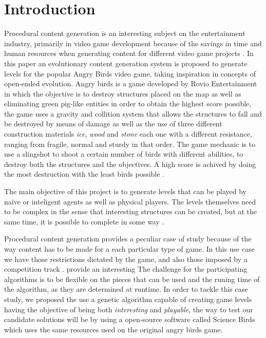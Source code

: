 \documentclass[conference]{IEEEtran}
\begin{document}
    \section{Introduction}
    Procedural content generation is an interesting subject on the entertainment
    industry, primarily in video game development because of the savings in 
    time and human resources when generating content for different video game projects \cite{Yannakakis2017,YannakakisContentGeneration}.
    In this paper an evolutionary content generation system is proposed to generate
    levels for the popular Angry Birds video game,
    taking inspiration in concepts of open-ended evolution. Angry birds is a game 
    developed by Rovio Entertainment in which the objective is to destroy structures
    placed on the map as well as eliminating
    green pig-like entities in order to obtain the highest score possible, the game
    uses a gravity and collition system that allows the structures to fall and be
    destroyed by means of damage as well as the use of three different construction
    materials \textit{ice}, \textit{wood} and \textit{stone} each one with a different
    resistance, ranging from fragile, normal and sturdy in that order. The game
    mechanic is to use a slingshot to shoot a certain number of birds with different
    abilities, to destroy both the structures and the objectives. A high score 
    is achived by doing the most destruction with the least birds possible 
    \cite{RovioEntertainmentCorporation2009}.
    
    The main objective of this project is to generate levels that can be played
    by naïve or inteligent agents as well as physical players. The levels
    themselves need to be complex in the sense that interesting structures can be
    created, but at the same time, it is possible to complete in some way
    \cite{Stephenson,Stephenson2018}.
    
    Procedural content generation provides a peculiar case of study because of the
    way
    content has to be made for a each particular type of game. In this use case we
    have those restrictions dictated by the game, and also those imposed by a
    competition track \cite{Renz}.%
    provide an interesting The challenge for the participating algorithms is to be
    flexible on the pieces that can be used and the runing time of the algorithm, as
    they are determined at runtime. 
    In order to tackle this case study, we proposed the use a genetic algorithm capable 
    of creating game levels having the objective of being both \textit{interesting} and 
    \textit{playable}, the way to test our candidate solutions will be by using a open-source
    software called Science Birds \cite{sciencebirds} which uses the same resources used on the
    original angry birds game.
    
\end{document}
